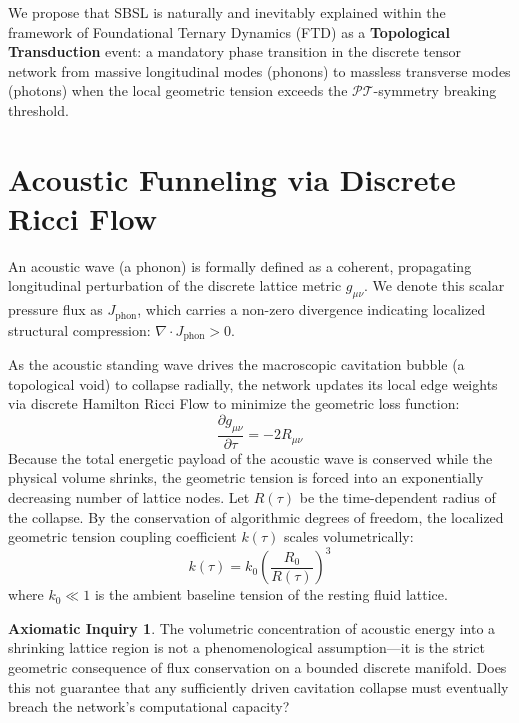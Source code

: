 \documentclass[11pt, letterpaper]{article}
\newcommand{\PT}{\mathcal{PT}}
\theoremstyle{definition}
\newtheorem{inquiry}{Axiomatic Inquiry}[section]
\theoremstyle{remark}
\begin{document}
We propose that SBSL is naturally and inevitably explained within the framework of Foundational Ternary Dynamics (FTD) \cite{Steinmetz2026_Zenodo} as a \textbf{Topological Transduction} event: a mandatory phase transition in the discrete tensor network from massive longitudinal modes (phonons) to massless transverse modes (photons) when the local geometric tension exceeds the $\PT$-symmetry breaking threshold.

\section{Acoustic Funneling via Discrete Ricci Flow}

An acoustic wave (a phonon) is formally defined as a coherent, propagating longitudinal perturbation of the discrete lattice metric $g_{\mu\nu}$. We denote this scalar pressure flux as $J_{\text{phon}}$, which carries a non-zero divergence indicating localized structural compression: $\nabla \cdot J_{\text{phon}} > 0$.

As the acoustic standing wave drives the macroscopic cavitation bubble (a topological void) to collapse radially, the network updates its local edge weights via discrete Hamilton Ricci Flow to minimize the geometric loss function:
\begin{equation}
    \frac{\partial g_{\mu\nu}}{\partial \tau} = -2R_{\mu\nu}
\end{equation}
Because the total energetic payload of the acoustic wave is conserved while the physical volume shrinks, the geometric tension is forced into an exponentially decreasing number of lattice nodes. Let $R(\tau)$ be the time-dependent radius of the collapse. By the conservation of algorithmic degrees of freedom, the localized geometric tension coupling coefficient $k(\tau)$ scales volumetrically:
\begin{equation}
    k(\tau) = k_0 \left( \frac{R_0}{R(\tau)} \right)^3
\end{equation}
where $k_0 \ll 1$ is the ambient baseline tension of the resting fluid lattice.

\begin{inquiry}
The volumetric concentration of acoustic energy into a shrinking lattice region is not a phenomenological assumption---it is the strict geometric consequence of flux conservation on a bounded discrete manifold. Does this not guarantee that any sufficiently driven cavitation collapse must eventually breach the network's computational capacity?
\end{inquiry}
\end{document}
